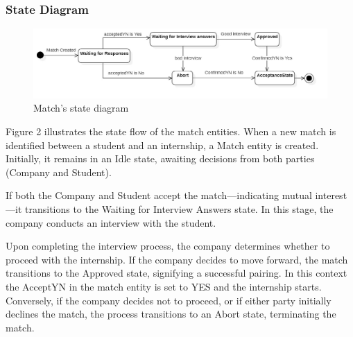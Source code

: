 \documentclass{article}
\begin{document}
\subsubsection{State Diagram}
\begin{figure}[H]
    \centering
    \includegraphics[width=1\linewidth]{StateDiagram.jpg}
    \caption{Match's state diagram}
    \label{fig:enter-label}
\end{figure}
Figure 2 illustrates the state flow of the match entities. When a new match is identified between a student and an internship, a Match entity is created. Initially, it remains in an Idle state, awaiting decisions from both parties (Company and Student).

If both the Company and Student accept the match—indicating mutual interest—it transitions to the Waiting for Interview Answers state. In this stage, the company conducts an interview with the student.

Upon completing the interview process, the company determines whether to proceed with the internship. If the company decides to move forward, the match transitions to the Approved state, signifying a successful pairing. In this context the AcceptYN in the match entity is set to YES and the internship starts.
Conversely, if the company decides not to proceed, or if either party initially declines the match, the process transitions to an Abort state, terminating the match.
\end{document}
